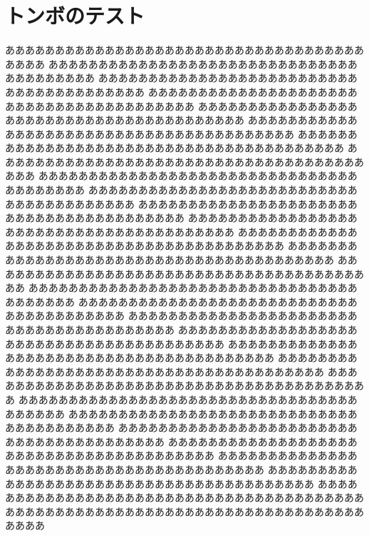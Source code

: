 \documentclass[twocolumn,tombow]{ltjsarticle}
\begin{document}
\section{トンボのテスト}
ああああああああああああああああああああああああああああああああああああああああ
ああああああああああああああああああああああああああああああああああああああああ
ああああああああああああああああああああああああああああああああああああああああ
ああああああああああああああああああああああああああああああああああああああああ
ああああああああああああああああああああああああああああああああああああああああ
ああああああああああああああああああああああああああああああああああああああああ
ああああああああああああああああああああああああああああああああああああああああ
ああああああああああああああああああああああああああああああああああああああああ
ああああああああああああああああああああああああああああああああああああああああ
ああああああああああああああああああああああああああああああああああああああああ
ああああああああああああああああああああああああああああああああああああああああ
ああああああああああああああああああああああああああああああああああああああああ
ああああああああああああああああああああああああああああああああああああああああ
ああああああああああああああああああああああああああああああああああああああああ
ああああああああああああああああああああああああああああああああああああああああ
ああああああああああああああああああああああああああああああああああああああああ
ああああああああああああああああああああああああああああああああああああああああ
ああああああああああああああああああああああああああああああああああああああああ
ああああああああああああああああああああああああああああああああああああああああ
ああああああああああああああああああああああああああああああああああああああああ
ああああああああああああああああああああああああああああああああああああああああ
ああああああああああああああああああああああああああああああああああああああああ
ああああああああああああああああああああああああああああああああああああああああ
ああああああああああああああああああああああああああああああああああああああああ
ああああああああああああああああああああああああああああああああああああああああ
ああああああああああああああああああああああああああああああああああああああああ
ああああああああああああああああああああああああああああああああああああああああ
ああああああああああああああああああああああああああああああああああああああああ
ああああああああああああああああああああああああああああああああああああああああ
ああああああああああああああああああああああああああああああああああああああああ
\end{document}
